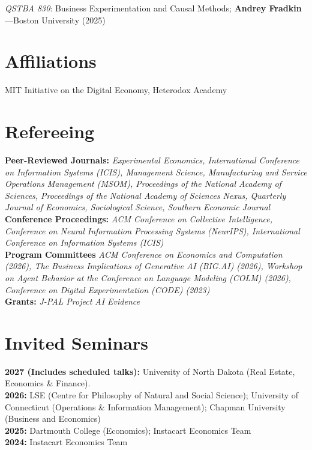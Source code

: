 \documentclass[margin,line,pifont,palatino,courier, 9pt]{res}
\begin{document}
\begin{resume}
\textit{QSTBA 830}: Business Experimentation and Causal Methods; \textbf{Andrey Fradkin}---Boston University (2025)

\section{\sc Affiliations}
MIT Initiative on the Digital Economy, Heterodox Academy

\section{\sc Refereeing}
\textbf{Peer-Reviewed Journals:} \textit{Experimental Economics, International Conference on Information Systems (ICIS), Management Science, Manufacturing and Service Operations Management (MSOM), Proceedings of the National Academy of Sciences, Proceedings of the National Academy of Sciences Nexus, Quarterly Journal of Economics, Sociological Science, Southern Economic Journal}\vspace{2mm}\\
\textbf{Conference Proceedings:} \textit{ACM Conference on Collective Intelligence, Conference on Neural Information Processing Systems (NeurIPS), International Conference on Information Systems (ICIS)}\vspace{2mm}\\
\textbf{Program Committees} \textit{ACM Conference on Economics and Computation (2026), The Business Implications of Generative AI (BIG.AI) (2026), Workshop on Agent Behavior at the Conference on Language Modeling (COLM) (2026), Conference on Digital Experimentation (CODE) (2023)}\vspace{2mm}\\
\textbf{Grants:} \textit{J-PAL Project AI Evidence}

\section{\sc Invited Seminars}
\textbf{2027 (Includes scheduled talks):} 
University of North Dakota (Real Estate, Economics \& Finance).\vspace{2mm}\\
\textbf{2026:} 
LSE (Centre for Philosophy of Natural and Social Science);
University of Connecticut (Operations \& Information Management);
Chapman University (Business and Economics)\vspace{2mm}\\
\textbf{2025:} 
Dartmouth College (Economics);
Instacart Economics Team\vspace{2mm}\\
\textbf{2024:}
Instacart Economics Team


\end{resume}
\end{document}
